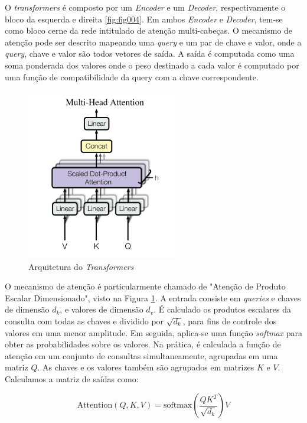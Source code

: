 O \textit{transformers} é composto por um \textit{Encoder} e um \textit{Decoder}, respectivamente o bloco da esquerda e direita \ref{fig:fig004}. Em ambos \textit{Encoder} e \textit{Decoder}, tem-se como bloco cerne da rede intitulado de atenção multi-cabeças. O mecanismo de atenção pode ser descrito mapeando uma \textit{query} e um par de chave e valor, onde a \textit{query}, chave e valor são todos vetores de saída. A saída é computada como uma soma ponderada dos valores onde o peso destinado a cada valor é computado por uma função de compatibilidade da query com a chave correspondente.

\begin{figure}[htbp]
    \centering
    \includegraphics[width=0.6\textwidth]{figures/fig005.png}
    \caption{Arquitetura do \textit{Transformers}}
    \label{fig:fig005}
\end{figure}

O mecanismo de atenção é particularmente chamado de "Atenção de Produto Escalar Dimensionado", visto na Figura \ref{fig:fig005}. A entrada consiste em \textit{queries} e chaves de dimensão $d_{k}$, e valores de dimensão $d_{v}$. É calculado os produtos escalares da consulta com todas as chaves e dividido por $\sqrt{d_{k}}$, para fins de controle dos valores em uma menor amplitude. Em seguida, aplica-se uma função \textit{softmax} para obter as probabilidades sobre os valores. Na prática, é calculada a função de atenção em um conjunto de consultas simultaneamente, agrupadas em uma matriz $Q$. As chaves e os valores também são agrupados em matrizes $K$ e $V$. Calculamos a matriz de saídas como:

\begin{equation}
\text{Attention}(Q, K, V) = \text{softmax}\left(\frac{QK^T}{\sqrt{d_k}}\right)V
\label{eq:attention}
\end{equation}

